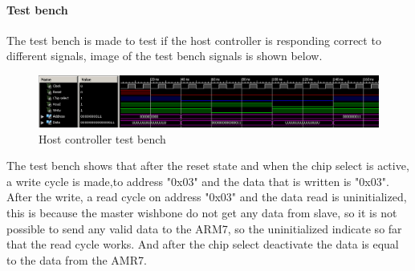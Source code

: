 \paragraph{Test bench}
The test bench is made to test if the host controller is responding correct to different signals, image of the test bench signals is shown below.
\begin{figure}[H]
	\begin{centering}
		 \includegraphics[width=1.0\textwidth]{images/host_controller_tb.png}
		\caption{Host controller test bench}
	\end{centering}
\end{figure}
The test bench shows that after the reset state and when the chip select is active, a write cycle is made,to address "0x03" and the data that is written is "0x03". After the write, a read cycle on address "0x03" and the data read is uninitialized, this is because the master wishbone do not get any data from slave, so it is not possible to send any valid data to the ARM7, so the uninitialized indicate so far that the read cycle works. And after the chip select deactivate the data is equal to the data from the AMR7.
